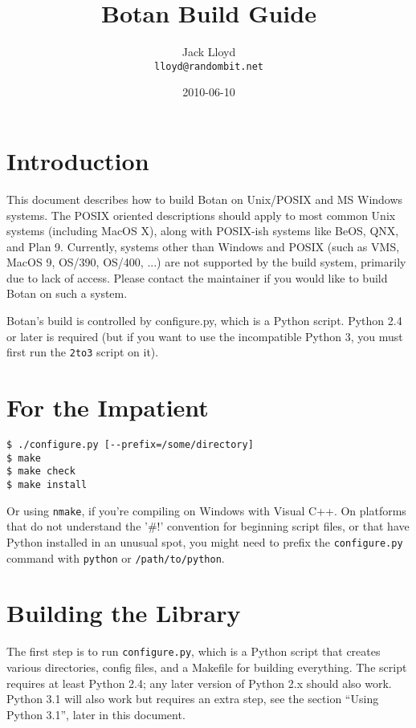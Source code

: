 \documentclass{article}
\title{\textbf{Botan Build Guide}}
\author{Jack Lloyd \\
        \texttt{lloyd@randombit.net}}
\date{2010-06-10}
\newcommand{\filename}[1]{\texttt{#1}}
\begin{document}
\maketitle

\tableofcontents

\parskip=5pt
\pagebreak

\section{Introduction}

This document describes how to build Botan on Unix/POSIX and MS
Windows systems. The POSIX oriented descriptions should apply to most
common Unix systems (including MacOS X), along with POSIX-ish systems
like BeOS, QNX, and Plan 9. Currently, systems other than Windows and
POSIX (such as VMS, MacOS 9, OS/390, OS/400, ...) are not supported by
the build system, primarily due to lack of access. Please contact the
maintainer if you would like to build Botan on such a system.

Botan's build is controlled by configure.py, which is a Python
script. Python 2.4 or later is required (but if you want to use the
incompatible Python 3, you must first run the \texttt{2to3} script on
it).

\section{For the Impatient}

\begin{verbatim}
$ ./configure.py [--prefix=/some/directory]
$ make
$ make check
$ make install
\end{verbatim}

Or using \verb|nmake|, if you're compiling on Windows with Visual
C++. On platforms that do not understand the '\#!' convention for
beginning script files, or that have Python installed in an unusual
spot, you might need to prefix the \texttt{configure.py} command with
\texttt{python} or \texttt{/path/to/python}.

\section{Building the Library}

The first step is to run \filename{configure.py}, which is a Python
script that creates various directories, config files, and a Makefile
for building everything. The script requires at least Python 2.4; any
later version of Python 2.x should also work. Python 3.1 will also
work but requires an extra step, see the section ``Using Python 3.1'',
later in this document.
\end{document}
